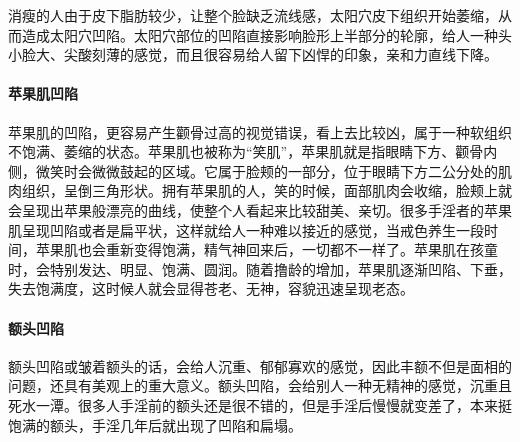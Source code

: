 消瘦的人由于皮下脂肪较少，让整个脸缺乏流线感，太阳穴皮下组织开始萎缩，从而造成太阳穴凹陷。太阳穴部位的凹陷直接影响脸形上半部分的轮廓，给人一种头小脸大、尖酸刻薄的感觉，而且很容易给人留下凶悍的印象，亲和力直线下降。

\paragraph{苹果肌凹陷}

苹果肌的凹陷，更容易产生颧骨过高的视觉错误，看上去比较凶，属于一种软组织不饱满、萎缩的状态。苹果肌也被称为“笑肌”，苹果肌就是指眼睛下方、颧骨内侧，微笑时会微微鼓起的区域。它属于脸颊的一部分，位于眼睛下方二公分处的肌肉组织，呈倒三角形状。拥有苹果肌的人，笑的时候，面部肌肉会收缩，脸颊上就会呈现出苹果般漂亮的曲线，使整个人看起来比较甜美、亲切。很多手淫者的苹果肌呈现凹陷或者是扁平状，这样就给人一种难以接近的感觉，当戒色养生一段时间，苹果肌也会重新变得饱满，精气神回来后，一切都不一样了。苹果肌在孩童时，会特别发达、明显、饱满、圆润。随着撸龄的增加，苹果肌逐渐凹陷、下垂，失去饱满度，这时候人就会显得苍老、无神，容貌迅速呈现老态。

\paragraph{额头凹陷}

额头凹陷或皱着额头的话，会给人沉重、郁郁寡欢的感觉，因此丰额不但是面相的问题，还具有美观上的重大意义。额头凹陷，会给别人一种无精神的感觉，沉重且死水一潭。很多人手淫前的额头还是很不错的，但是手淫后慢慢就变差了，本来挺饱满的额头，手淫几年后就出现了凹陷和扁塌。

